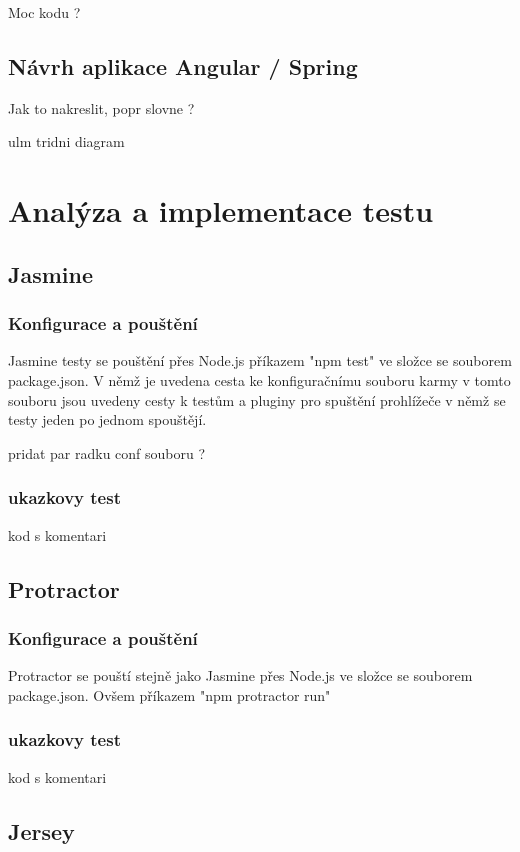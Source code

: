\documentclass[czech,master,public,dept460,male,cpdeclaration,twoside]{diploma}
\begin{document}
Moc kodu ?

\subsection{Návrh aplikace Angular / Spring}
Jak to nakreslit, popr slovne ?

ulm tridni diagram

\section{Analýza a implementace testu}

\subsection{Jasmine}
\subsubsection{Konfigurace a pouštění}
Jasmine testy se pouštění přes Node.js příkazem "npm test" ve složce se souborem package.json. V němž je uvedena cesta ke konfiguračnímu souboru karmy v tomto souboru jsou uvedeny cesty k testům a pluginy pro spuštění prohlížeče v němž se testy jeden po jednom spouštějí. 

pridat par radku conf souboru ?

\subsubsection{ukazkovy test}
kod s komentari



\subsection{Protractor}
\subsubsection{Konfigurace a pouštění}
Protractor se pouští stejně jako Jasmine přes Node.js ve složce se souborem package.json. Ovšem příkazem "npm protractor run"

\subsubsection{ukazkovy test}
kod s komentari


\subsection{Jersey}
\end{document}

